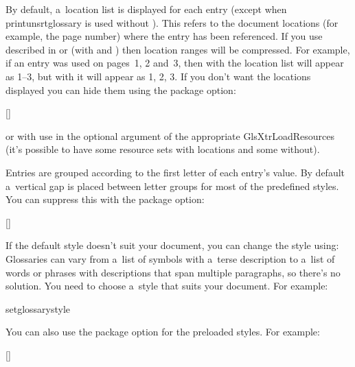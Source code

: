 \documentclass[titlepage=false,oneside,
 fontsize=12pt,captions=tableheading]{scrarticle}
\newcommand{\resourceoptval}[2]{\optval{resource.#1}{#2}}
\begin{document}
By default, a~location list is displayed for each entry (except
when \gls{printunsrtglossary} is used without ). This refers
to the document locations (for example, the page number) where the
entry has been referenced. If you use  described in
 or  (with  and
) then location ranges will be compressed.
For example, if an entry was used on pages~1, 2 and~3, then with
 the location list will appear as 1--3, but
with  it
will appear as 1, 2, 3. If you don't want the locations displayed
you can hide them using the  package option:
\begin{codebox}
[]
\end{codebox}
or with  use \resourceoptval{save-locations}{false} in the
optional argument of the appropriate \gls{GlsXtrLoadResources}
(it's possible to have some resource sets with locations and some
without).

Entries are grouped according to the first letter of
each entry's  value. By default a~vertical gap is placed
between letter groups for most of the predefined styles. You can suppress this with the
 package option:
\begin{codebox}
[]
\end{codebox}

If the default style doesn't suit your document, you can change the
style using:
 Glossaries can vary from
a~list of symbols with a~terse description to a~list of words or
phrases with descriptions that span multiple paragraphs, so there's
no  solution. You need to choose a~style that
suits your document. For example:
\begin{codebox*}
\gls{setglossarystyle}
\end{codebox*}
You can also use the  package option for the preloaded
styles. For example:
\begin{codebox}
[]
\end{codebox}
\end{document}
